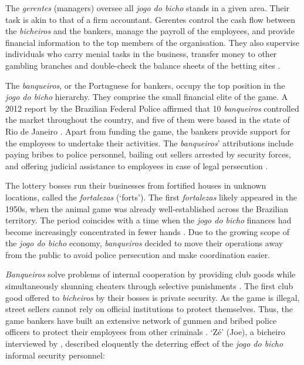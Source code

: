 \documentclass[a4paper,12pt]{article}
\begin{document}
The \textit{gerentes} (managers) oversee all \textit{jogo do bicho} stands in a given area. Their task is akin to that of a firm accountant. Gerentes control the cash flow between the \textit{bicheiros} and the bankers, manage the payroll of the employees, and provide financial information to the top members of the organisation. They also supervise individuals who carry menial tasks in the business, transfer money to other gambling branches and double-check the balance sheets of the betting sites \citetext{\citealp[71]{labronici2012paratodos}; \citealp[142]{misse2007illegal}}.

The \textit{banqueiros}, or the Portuguese for bankers, occupy the top position in the \textit{jogo do bicho} hierarchy. They comprise the small financial elite of the game. A 2012 report by the Brazilian Federal Police affirmed that 10 \textit{banqueiros} controlled the market throughout the country, and five of them were based in the state of Rio de Janeiro \citep{globo2012contraventores}. Apart from funding the game, the bankers provide support for the employees to undertake their activities. The \textit{banqueiros}' attributions include paying bribes to police personnel, bailing out sellers arrested by security forces, and offering judicial assistance to employees in case of legal persecution \citep[75]{labronici2012paratodos}.

The lottery bosses run their businesses from fortified houses in unknown locations, called the \textit{fortalezas} (`forts'). The first \textit{fortalezas} likely appeared in the 1950s, when the animal game was already well-established across the Brazilian territory. The period coincides with a time when the \textit{jogo do bicho} finances had become increasingly concentrated in fewer hands \citep[259]{chazkel2011laws}. Due to the growing scope of the \textit{jogo do bicho} economy, \textit{banqueiros} decided to move their operations away from the public to avoid police persecution and make coordination easier. 

\textit{Banqueiros} solve problems of internal cooperation by providing club goods \citep{buchanan1965economic} while simultaneously shunning cheaters through selective punishments \citep{bo2005cooperation, roth1978equilibrium}. The first club good offered to \textit{bicheiros} by their bosses is private security. As the game is illegal, street sellers cannot rely on official institutions to protect themselves. Thus, the game bankers have built an extensive network of gunmen and bribed police officers to protect their employees from other criminals \citetext{\citealp[48]{chinelli1993vazio}; \citealp[51]{labronici2012paratodos}}. `Zé' (Joe), a bicheiro interviewed by \citet[52]{labronici2012paratodos}, described eloquently the deterring effect of the \textit{jogo do bicho} informal security personnel:
\end{document}
